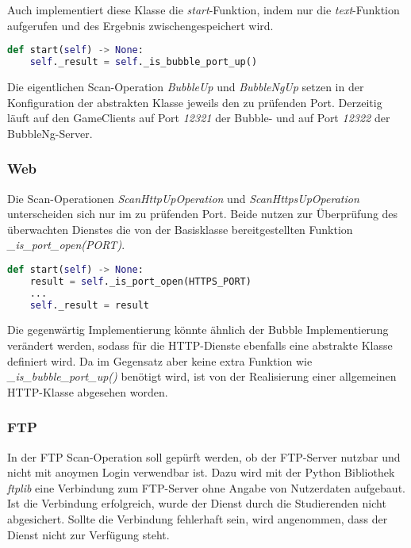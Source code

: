 Auch implementiert diese Klasse die \textit{start}-Funktion, indem nur die \textit{text}-Funktion aufgerufen und des Ergebnis zwischengespeichert wird.
\begin{lstlisting}[language=Python, frame=single, caption={Big Brother Bubble Scan-Operation}, captionpos=b, label={lst:bigbrother-host-up}]
def start(self) -> None:
	self._result = self._is_bubble_port_up()
\end{lstlisting} 

Die eigentlichen Scan-Operation \textit{BubbleUp} und \textit{BubbleNgUp} setzen in der Konfiguration der abstrakten Klasse jeweils den zu prüfenden Port. Derzeitig läuft auf den GameClients auf Port \textit{12321} der Bubble- und auf Port \textit{12322} der BubbleNg-Server.
\subsubsection{Web}

Die Scan-Operationen \textit{ScanHttpUpOperation} und \textit{ScanHttpsUpOperation} unterscheiden sich nur im zu prüfenden Port. Beide nutzen zur Überprüfung des überwachten Dienstes die von der Basisklasse bereitgestellten Funktion \textit{\_is\_port\_open(PORT)}.

\begin{lstlisting}[language=Python, frame=single, caption={Big Brother HTTP(S) Scan-Operation}, captionpos=b, label={lst:bigbrother-http-up}]
def start(self) -> None:
	result = self._is_port_open(HTTPS_PORT)
	...
	self._result = result
\end{lstlisting} 

Die gegenwärtig Implementierung könnte ähnlich der Bubble Implementierung verändert werden, sodass für die HTTP-Dienste ebenfalls eine abstrakte Klasse definiert wird. Da im Gegensatz aber keine extra Funktion wie \textit{\_is\_bubble\_port\_up()} benötigt wird, ist von der Realisierung einer allgemeinen HTTP-Klasse abgesehen worden.

\subsubsection{FTP}
In der FTP Scan-Operation soll gepürft werden, ob der FTP-Server nutzbar und nicht mit anoymen Login verwendbar ist. Dazu wird mit der Python Bibliothek \textit{ftplib} eine Verbindung zum FTP-Server ohne Angabe von Nutzerdaten aufgebaut. Ist die Verbindung erfolgreich, wurde der Dienst durch die Studierenden nicht abgesichert. Sollte die Verbindung fehlerhaft sein, wird angenommen, dass der Dienst nicht zur Verfügung steht. 

